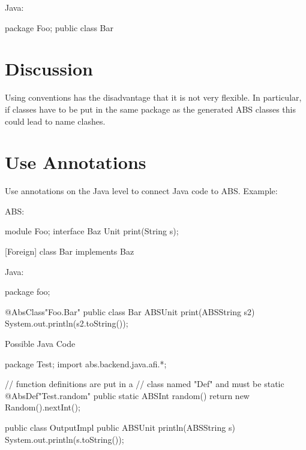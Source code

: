 \documentclass[a4paper,11pt,final]{article}
\begin{document}
\noindent Java:
\begin{javaexample}
package Foo;
public class Bar {

}
\end{javaexample}

\section{Discussion}
Using conventions has the disadvantage that it is not very flexible. In
particular, if classes have to be put in the same package as the generated ABS
classes this could lead to name clashes.

      
\section{Use Annotations}
Use annotations on the Java level to connect Java code to ABS.
Example:
     
\noindent ABS:
\begin{absexamplen}
module Foo;
interface Baz {
  Unit print(String s);
}

[Foreign]
class Bar implements Baz { }
\end{absexamplen}     


\noindent Java:
\begin{javaexample}
package foo;

@AbsClass{"Foo.Bar"}
public class Bar {
  ABSUnit print(ABSString s2) {
    System.out.println(s2.toString());
  }
}
\end{javaexample}

\noindent Possible Java Code
\begin{javaexample}
package Test;
import abs.backend.java.afi.*;

// function definitions are put in a
// class named "Def" and must be static
@AbsDef{"Test.random"}
public static ABSInt random() {
  return new Random().nextInt();
}

public class OutputImpl {
  public ABSUnit println(ABSString s) {
    System.out.println(s.toString());
  }
}
\end{javaexample}
\end{document}
